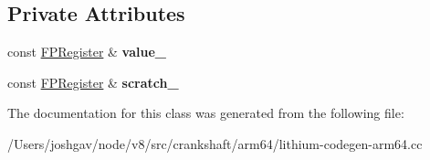 \subsection*{Private Attributes}
\begin{DoxyCompactItemize}
\item 
const \hyperlink{structv8_1_1internal_1_1_f_p_register}{F\+P\+Register} \& {\bfseries value\+\_\+}\hypertarget{classv8_1_1internal_1_1_branch_if_non_zero_number_aee85f626d32f3bb67bf8c803f64baa5a}{}\label{classv8_1_1internal_1_1_branch_if_non_zero_number_aee85f626d32f3bb67bf8c803f64baa5a}

\item 
const \hyperlink{structv8_1_1internal_1_1_f_p_register}{F\+P\+Register} \& {\bfseries scratch\+\_\+}\hypertarget{classv8_1_1internal_1_1_branch_if_non_zero_number_a826c37781b7d7f1a89f17b9c771e995b}{}\label{classv8_1_1internal_1_1_branch_if_non_zero_number_a826c37781b7d7f1a89f17b9c771e995b}

\end{DoxyCompactItemize}


The documentation for this class was generated from the following file\+:\begin{DoxyCompactItemize}
\item 
/\+Users/joshgav/node/v8/src/crankshaft/arm64/lithium-\/codegen-\/arm64.\+cc\end{DoxyCompactItemize}
